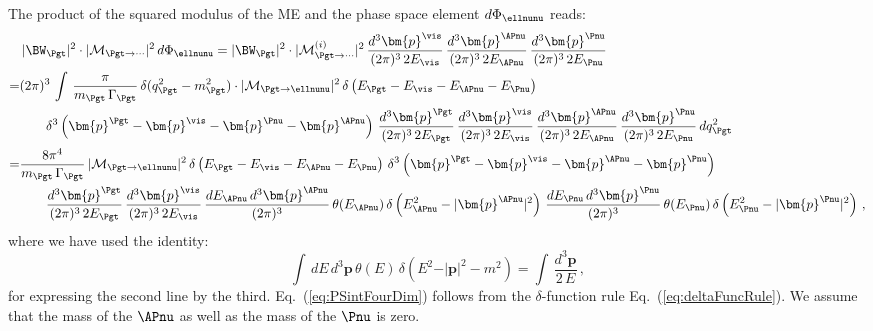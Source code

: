 The product of the squared modulus of the ME and the phase space
element $d\Phi_{\ellnunu}$ reads:
\begin{align}
& \, \vert \BW_{\Pgt} \vert^{2} \cdot \vert\mathcal{M}_{\Pgt\to\cdots}\vert^{2} \,
 d\Phi_{\ellnunu} = \vert \BW_{\Pgt} \vert^{2} \cdot \vert \mathcal{M}^{(i)}_{\Pgt\to\cdots}
\vert^{2} \, 
  \frac{d^{3}\bm{p}^{\vis}}{(2\pi)^{3} \, 2 E_{\vis}} \, 
  \frac{d^{3}\bm{p}^{\APnu}}{(2\pi)^{3} \, 2 E_{\APnu}} \,
  \frac{d^{3}\bm{p}^{\Pnu}}{(2\pi)^{3} \, 2 E_{\Pnu}} \nonumber \\
= & (2\pi)^{3} \, \int \, \frac{\pi}{m_{\Pgt} \, \Gamma_{\Pgt}} \,
\delta ( q_{\Pgt}^{2} - m_{\Pgt}^{2} ) \cdot
\vert\mathcal{M}_{\Pgt \to \ellnunu}\vert^{2} \, \delta \left(
  E_{\Pgt} - E_{\vis} - E_{\APnu} - E_{\Pnu} \right) \nonumber \\
& \qquad
\delta^{3} \left( \bm{p}^{\Pgt} - \bm{p}^{\vis} - \bm{p}^{\Pnu} - \bm{p}^{\APnu} \right) \, \frac{d^{3}\bm{p}^{\Pgt}}{(2\pi)^{3} \, 2 E_{\Pgt}} \,
  \frac{d^{3}\bm{p}^{\vis}}{(2\pi)^{3} \, 2 E_{\vis}} \, 
  \frac{d^{3}\bm{p}^{\APnu}}{(2\pi)^{3} \, 2 E_{\APnu}} \, 
  \frac{d^{3}\bm{p}^{\Pnu}}{(2\pi)^{3} \, 2 E_{\Pnu}} \, dq^{2}_{\Pgt} \nonumber \\
= & \frac{8\pi^{4}}{m_{\Pgt} \, \Gamma_{\Pgt}} \, \vert\mathcal{M}_{\Pgt \to
  \ellnunu}\vert^{2} \, \delta \left( E_{\Pgt} - E_{\vis} - E_{\APnu} - E_{\Pnu} \right) \, \delta^{3} \left( \bm{p}^{\Pgt} -
  \bm{p}^{\vis} - \bm{p}^{\APnu} - \bm{p}^{\Pnu} \right)  \nonumber \\
& \qquad
  \frac{d^{3}\bm{p}^{\Pgt}}{(2\pi)^{3} \, 2 E_{\Pgt}} \,
  \frac{d^{3}\bm{p}^{\vis}}{(2\pi)^{3} \, 2 E_{\vis}} \,
  \frac{dE_{\APnu} \, d^{3}\bm{p}^{\APnu}}{(2\pi)^{3}} \,
  \theta(E_{\APnu}) \, \delta \left( E_{\APnu}^{2} - \vert\bm{p}^{\APnu}\vert^{2} \right) \,
  \frac{dE_{\Pnu} \, d^{3}\bm{p}^{\Pnu}}{(2\pi)^{3}} \,
  \theta(E_{\Pnu}) \, \delta \left( E_{\Pnu}^{2} - \vert\bm{p}^{\Pnu}\vert^{2} \right) \, , 
\end{align}
where we have used the identity:
\begin{equation}
\int \, dE \, d^{3}\bm{p} \, \theta(E) \, \delta \left( E^{2} -
  \vert\bm{p}\vert^{2} - m^{2} \right) = \int \, \frac{d^{3}\bm{p}}{2
  \, E} \, ,
\label{eq:PSintFourDim}
\end{equation}
for expressing the second line by the third.
Eq.~(\ref{eq:PSintFourDim}) follows from the $\delta$-function rule Eq.~(\ref{eq:deltaFuncRule}).
We assume that the mass of the $\APnu$ as well as the mass of the $\Pnu$ is zero.

